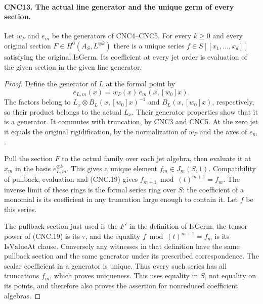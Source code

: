 \documentclass[11pt,a4paper]{article}
\numberwithin{equation}{section}
\theoremstyle{remark}\newtheorem{remark}[theorem]{Remark}
\begin{document}
\paragraph{CNC13. The actual line generator and the unique germ of every section.}
\label{claim:CNC13}
Let \(w_P\) and \(e_m\) be the generators of CNC4--CNC5.
For every \(k\geq0\) and every original section
\(F\in H^0(A_S,L^{\otimes k})\) there is a unique series
\(f\in S[[x_1,\ldots,x_d]]\) satisfying the original
\(\mathrm{IsGerm}\).  Its coefficient at every jet order is
evaluation of the given section in the given line generator.
\begin{proof}
Define the generator of \(L\) at the formal point by
\[
 e_{L,m}(x)=w_P(x)\,e_m(x,[w_0]x).                           \tag{CNC.19}
\]
The factors belong to \(L_x\otimes B_L(x,[w_0]x)^{-1}\)
and \(B_L(x,[w_0]x)\), respectively, so their product belongs
to the actual \(L_x\).  Their generator properties show that it is
a generator.  It commutes with truncation, by CNC3 and CNC5.
At the zero jet it equals the original rigidification, by the
normalization of \(w_P\) and the axes of \(e_m\).

Pull the section \(F\) to the actual family over each jet algebra,
then evaluate it at \(x_m\) in the basis \(e_{L,m}^{\otimes k}\).
This gives a unique element \(f_m\in J_m(S,1)\).
Compatibility of pullback, evaluation and (CNC.19) gives
\(f_{m+1}\bmod(t)^{m+1}=f_m\).
The inverse limit of these rings is the formal series ring over \(S\):
the coefficient of a monomial is its coefficient in any truncation
large enough to contain it.  Let \(f\) be this series.

The pullback section just used is the \(F'\) in the definition of
\(\mathrm{IsGerm}\), the tensor power of (CNC.19) is its
\(\tau\), and the equality \(f\bmod(t)^{m+1}=f_m\) is its
\(\mathrm{IsValueAt}\) clause.  Conversely any witnesses in that
definition have the same pullback section and the same generator under
its prescribed correspondence.  The scalar coefficient in a generator
is unique.  Thus every such series has all truncations \(f_m\),
which proves uniqueness.  This uses equality in \(S\), not equality
on its points, and therefore also proves the assertion for nonreduced
coefficient algebras.
\end{proof}

\end{document}
